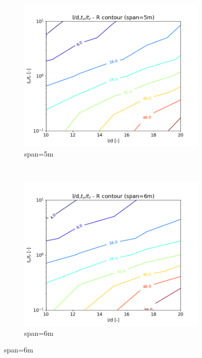 \begin{figure}
\begin{subfigure}[b]{.49\textwidth}
  \centering
  \includegraphics[width=.99\linewidth]{images/l2d,gamma_R_5m.png}
  \caption{span=5m}
\end{subfigure}
~
\begin{subfigure}[b]{.49\textwidth}
  \centering
  \includegraphics[width=.99\linewidth]{images/l2d,gamma_R_6m.png}
  \caption{span=6m}
\end{subfigure}


\end{figure}
